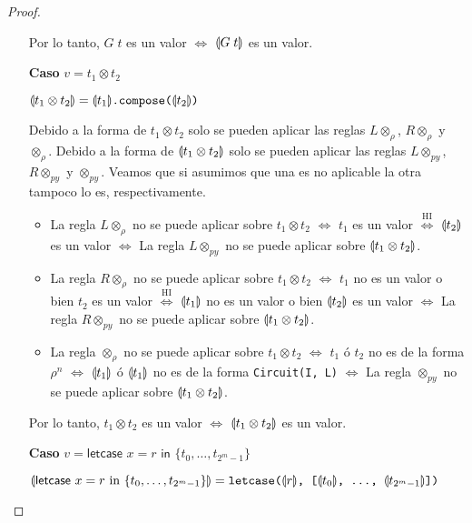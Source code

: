 \begin{proof}
\begin{itemize}
Por lo tanto, $G\;t$ es un valor $\Leftrightarrow$ $\llparenthesis G\;t \rrparenthesis$ es un valor.

     \item[\textbf{Caso}] $v=t_1\otimes t_2$
     
$\llparenthesis t_1 \otimes t_2 \rrparenthesis = \llparenthesis t_1 \rrparenthesis\texttt{.compose(\ensuremath{\llparenthesis t_2 \rrparenthesis})}$

Debido a la forma de $t_1 \otimes t_2$ solo se pueden aplicar las reglas $L\otimes_\rho$, $R\otimes_\rho$ y $\otimes_\rho$. Debido a la forma de  $\llparenthesis t_1 \otimes t_2 \rrparenthesis$ solo se pueden aplicar las reglas $L\otimes_\textit{py}$, $R\otimes_\textit{py}$ y $\otimes_\textit{py}$. Veamos que si asumimos que una es no aplicable la otra tampoco lo es, respectivamente.
\begin{itemize}
    \item La regla $L\otimes_\rho$ no se puede aplicar sobre $t_1 \otimes t_2$ $\Leftrightarrow$ $t_1$ es un valor $\stackrel{\textrm{HI}}{\Leftrightarrow}$ $\llparenthesis t_2 \rrparenthesis$ es un valor $\Leftrightarrow$ La regla $L\otimes_\textit{py}$ no se puede aplicar sobre $\llparenthesis t_1 \otimes t_2 \rrparenthesis$.
    \item La regla $R\otimes_\rho$ no se puede aplicar sobre $t_1 \otimes t_2$ $\Leftrightarrow$ $t_1$ no es un valor o bien $t_2$ es un valor $\stackrel{\textrm{HI}}{\Leftrightarrow}$ $\llparenthesis t_1 \rrparenthesis$ no es un valor o bien $\llparenthesis t_2 \rrparenthesis$ es un valor $\Leftrightarrow$ La regla $R\otimes_\textit{py}$ no se puede aplicar sobre $\llparenthesis t_1 \otimes t_2 \rrparenthesis$.
    \item  La regla $\otimes_\rho$ no se puede aplicar sobre $t_1 \otimes t_2$ $\Leftrightarrow$ $t_1$ ó $t_2$ no es de la forma $\rho^n$ $\Leftrightarrow$ $\llparenthesis t_1 \rrparenthesis$ ó $\llparenthesis t_1 \rrparenthesis$ no es de la forma \texttt{Circuit(I, L)} $\Leftrightarrow$ La regla $\otimes_\textit{py}$ no se puede aplicar sobre $\llparenthesis t_1 \otimes t_2 \rrparenthesis$.
\end{itemize}

Por lo tanto, $t_1 \otimes t_2$ es un valor $\Leftrightarrow$ $\llparenthesis t_1 \otimes t_2 \rrparenthesis$ es un valor.

     \item[\textbf{Caso}] $v=\textsf{letcase }x = r \textsf{ in } \{t_0,\dots,t_{2^m-1}\}$ 
     
$\llparenthesis \textsf{letcase }x = r \textrm{ in } \{t_0,\dots,t_{2^m-1}\}  \rrparenthesis = \texttt{letcase(\ensuremath{\llparenthesis r \rrparenthesis}, [\ensuremath{\llparenthesis t_0 \rrparenthesis}, \dots, \ensuremath{\llparenthesis t_{2^m-1} \rrparenthesis}])}$


\end{itemize}
\end{proof}
